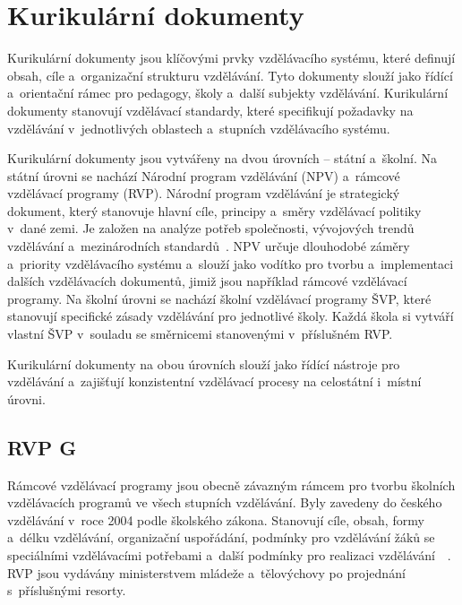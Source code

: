 \documentclass[
  digital,     %
  oneside,     %
  nosansbold,  %
  colorbold, %
  lof,         %
  nolot,         %
]{fithesis4}
\begin{document}
\section{Kurikulární dokumenty}
Kurikulární dokumenty jsou klíčovými prvky vzdělávacího systému, které definují obsah, cíle a~organizační strukturu vzdělávání. Tyto dokumenty slouží jako řídící a~orientační rámec pro pedagogy, školy a~další subjekty vzdělávání. Kurikulární dokumenty stanovují vzdělávací standardy, které specifikují požadavky na vzdělávání v~jednotlivých oblastech a~stupních vzdělávacího systému.

Kurikulární dokumenty jsou vytvářeny na dvou úrovních -- státní a~školní. Na státní úrovni se nachází Národní program vzdělávání (NPV) a~rámcové vzdělávací programy (RVP). Národní program vzdělávání je strategický dokument, který stanovuje hlavní cíle, principy a~směry vzdělávací politiky v~dané zemi. Je založen na analýze potřeb společnosti, vývojových trendů vzdělávání a~mezinárodních standardů~\cite{Kotasek01}. NPV určuje dlouhodobé záměry a~priority vzdělávacího systému a~slouží jako vodítko pro tvorbu a~implementaci dalších vzdělávacích dokumentů, jimiž jsou například rámcové vzdělávací programy. Na školní úrovni se nachází školní vzdělávací programy ŠVP, které stanovují specifické zásady vzdělávání pro jednotlivé školy. Každá škola si vytváří vlastní ŠVP v~souladu se směrnicemi stanovenými v~příslušném RVP. 

Kurikulární dokumenty na obou úrovních slouží jako řídící nástroje pro vzdělávání a~zajišťují konzistentní vzdělávací procesy na celostátní i~místní úrovni.


\subsection{RVP G}
Rámcové vzdělávací programy jsou obecně závazným rámcem pro tvorbu školních vzdělávacích programů ve všech stupních vzdělávání. Byly zavedeny do českého vzdělávání v~roce 2004 podle školského zákona. Stanovují cíle, obsah, formy a~délku vzdělávání, organizační uspořádání, podmínky pro vzdělávání žáků se speciálními vzdělávacími potřebami a~další podmínky pro realizaci vzdělávání~~\cite{npiRVP}. RVP jsou vydávány ministerstvem mládeže a~tělovýchovy po projednání s~příslušnými resorty.
\end{document}
